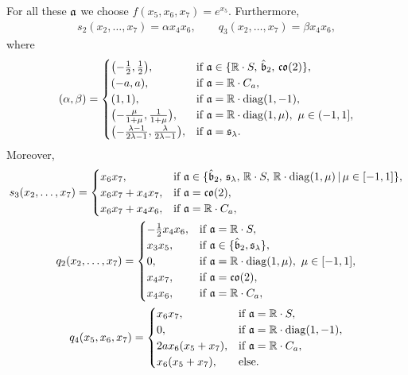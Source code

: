 \documentclass[pdftex]{sigma}
\numberwithin{equation}{section}
\newcommand\fa{{\frak a}}
\newcommand\fb{{\frak b}}
\newcommand\fs{{\frak s}}
\newcommand{\fco}{\mathop{{\frak c \frak o}}}
\newcommand\RR{{\mathbb R}}
\newcommand{\diag}{\operatorname{diag}}
\begin{document}
For all these $\fa$ we choose $f(x_5,x_6,x_7) = e^{x_5}$. Furthermore, \begin{gather*}s_2(x_2,\dots, x_7)=\alpha x_4x_6,\qquad q_3(x_2,\dots, x_7)=\beta x_4x_6,\end{gather*} where
\begin{gather*} (\alpha,\beta) = \begin{cases}
\big({-}\tfrac12, \tfrac12\big), & \text{if } \fa\in \{\RR\cdot S,\, \hat \fb_2,\, \fco(2) \},\\
(-a,a),& \text{if } \fa=\RR\cdot C_a,\\
(1,1),& \text{if } \fa=\RR\cdot\diag(1,-1),\\
\big({-}\tfrac{\mu}{1+\mu}, \tfrac1{1+\mu}\big), & \text{if } \fa=\RR\cdot\diag(1,\mu),\ \mu\in(-1,1],\\
 \big({-}\tfrac{\lambda-1}{2\lambda -1}, \tfrac \lambda{2\lambda-1}\big), & \text{if } \fa=\fs_\lambda.\\
\end{cases}\end{gather*}
Moreover,
\begin{gather*}
 s_3 (x_2, \dots, x_7) = \begin{cases}
x_6x_7,& \text{if } \fa \in\{ \hat \fb_2,\, \fs_\lambda ,\, \RR\cdot S,\, \RR\cdot\diag(1,\mu) \,|\,\mu\in [-1,1] \}, \\
x_6x_7+x_4x_7,& \text{if } \fa =\fco(2) , \\
x_6x_7+x_4x_6,& \text{if } \fa =\RR\cdot C_a ,
\end{cases} \\
q_2 (x_2, \dots, x_7) = \begin{cases}
-\tfrac12 x_4x_6,& \text{if } \fa=\RR\cdot S, \\
x_3x_5,& \text{if } \fa \in\{\hat\fb_2,\fs_\lambda\} , \\
0,& \text{if } \fa =\RR\cdot \diag(1,\mu) , \ \mu\in[-1,1], \\
x_4x_7,& \text{if } \fa =\fco(2),\\
x_4x_6,& \text{if } \fa =\RR\cdot C_a,
\end{cases}\\
q_4(x_5,x_6, x_7)=\begin{cases}x_6x_7,& \text{if } \fa=\RR\cdot S,\\
0,& \text{if } \fa=\RR\cdot \diag(1,-1),\\
2ax_6(x_5+x_7) ,& \text{if } \fa=\RR\cdot C_a,\\
x_6(x_5+x_7),& \text{else.}
\end{cases}
\end{gather*}
\end{document}
